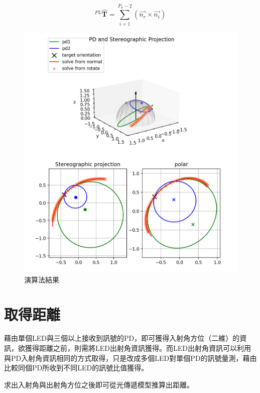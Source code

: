 \begin{equation}
    ^{PL}\hat{\boldsymbol{T}} = 
    \sum_{i=1}^{P_u-2} (\vec{n_{r}}\times\vec{n_{i}})
\end{equation}

\begin{figure}[ht]
    \centering
    \includegraphics[width=12cm]{ch3pic/solve_targetori.png}
    \caption{演算法結果}
    \label{solve_ori}
\end{figure}


\section{取得距離}

藉由單個LED與三個以上接收到訊號的PD，即可獲得入射角方位（二維）的資訊，欲獲得距離之前，則需將LED出射角資訊獲得。而LED出射角資訊可以利用與PD入射角資訊相同的方式取得，只是改成多個LED對單個PD的訊號量測，藉由比較同個PD所收到不同LED的訊號比值獲得。


求出入射角與出射角方位之後即可從光傳遞模型推算出距離。


